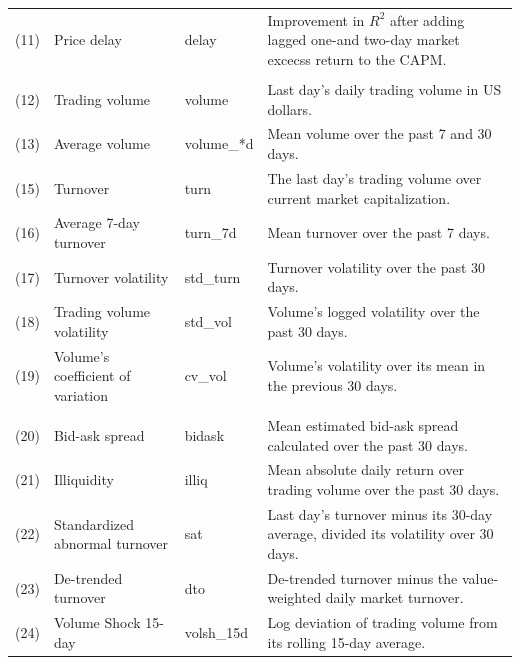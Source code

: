 \documentclass[
  12pt,
  a4paper,
  openany]{scrbook}
\begin{document}
\begin{table}
\begin{tabular}[t]{l>{\raggedright\arraybackslash}p{10em}l>{\raggedright\arraybackslash}p{27em}}
\hspace{1em}(11) & Price delay & delay & Improvement in \(R^2\) after adding lagged one-and two-day market excecss return to the CAPM.\\
\addlinespace[0.3em]
\multicolumn{4}{l}{\textbf{Panel C: Trading activity}}\\
\hspace{1em}(12) & Trading volume & volume & Last day's daily trading volume in US dollars.\\
\hspace{1em}(13) & Average volume & volume\_*d & Mean volume over the past 7 and 30 days.\\
\hspace{1em}(15) & Turnover & turn & The last day's trading volume over current market capitalization.\\
\hspace{1em}(16) & Average 7-day turnover & turn\_7d & Mean turnover over the past 7 days.\\
\hspace{1em}(17) & Turnover volatility & std\_turn & Turnover volatility over the past 30 days.\\
\hspace{1em}(18) & Trading volume volatility & std\_vol & Volume's logged volatility over the past 30 days.\\
\hspace{1em}(19) & Volume's coefficient of variation & cv\_vol & Volume's volatility over its mean in the previous 30 days.\\
\addlinespace[0.3em]
\multicolumn{4}{l}{\textbf{Panel D: Liquidity}}\\
\hspace{1em}(20) & Bid-ask spread & bidask & Mean estimated bid-ask spread calculated over the past 30 days.\\
\hspace{1em}(21) & Illiquidity & illiq & Mean absolute daily return over trading volume over the past 30 days.\\
\hspace{1em}(22) & Standardized abnormal turnover & sat & Last day's turnover minus its 30-day average, divided its volatility over 30 days.\\
\hspace{1em}(23) & De-trended turnover & dto & De-trended turnover minus the value-weighted daily market turnover.\\
\hspace{1em}(24) & Volume Shock 15-day & volsh\_15d & Log deviation of trading volume from its rolling 15-day average.\\

\end{tabular}
\end{table}
\end{document}
